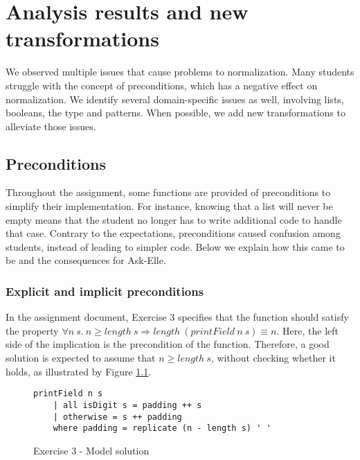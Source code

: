 \chapter{Analysis results and new transformations}
\label{sec:analysis-results}







We observed multiple issues that cause problems to normalization. Many students struggle with the concept of preconditions, which has a negative effect on normalization. We identify several domain-specific issues as well, involving lists, booleans, the  type and patterns. When possible, we add new transformations to alleviate those issues.

\section{Preconditions}
\label{sec:analysis-preconditions}

Throughout the assignment, some functions are provided of preconditions to simplify their implementation. For instance, knowing that a list will never be empty means that the student no longer has to write additional code to handle that case. Contrary to the expectations, preconditions caused confusion among students, instead of leading to simpler code. Below we explain how this came to be and the consequences for Ask-Elle. %

\subsection{Explicit and implicit preconditions}

In the assignment document, Exercise 3 specifies that the function  should satisfy the property $\forall n\ s.\ n \geq length\ s \Rightarrow length\ (printField\ n\ s) \equiv n$. Here, the left side of the implication is the precondition of the function. Therefore, a good solution is expected to assume that $n \geq length\ s$, without checking whether it holds, as illustrated by Figure \ref{fig:ex3-model-solution}.

\begin{figure}[H]
\centering
\begin{verbatim}
printField n s
    | all isDigit s = padding ++ s
    | otherwise = s ++ padding
    where padding = replicate (n - length s) ' '
\end{verbatim}
\caption{Exercise 3 - Model solution}
\label{fig:ex3-model-solution}
\end{figure}

